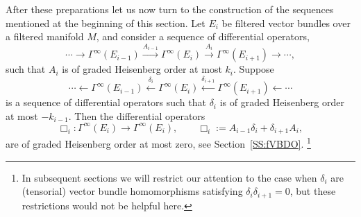 \documentclass[reqno,12pt]{amsart}
\theoremstyle{plain}
\theoremstyle{definition}
\begin{document}
After these preparations let us now turn to the construction of the sequences mentioned at the beginning of this section.
Let $E_i$ be filtered vector bundles over a filtered manifold $M$, and consider a sequence of differential operators,
\begin{equation}\label{E:EAE}
\cdots\to\Gamma^\infty(E_{i-1})\xrightarrow{A_{i-1}}\Gamma^\infty(E_i)\xrightarrow{A_i}\Gamma^\infty(E_{i+1})\to\cdots,
\end{equation}
such that $A_i$ is of graded Heisenberg order at most $k_i$.
Suppose
\begin{equation}\label{E:EdelE}
\cdots\leftarrow\Gamma^\infty(E_{i-1})\xleftarrow{\delta_i}\Gamma^\infty(E_i)\xleftarrow{\delta_{i+1}}\Gamma^\infty(E_{i+1})\leftarrow\cdots
\end{equation}
is a sequence of differential operators such that $\delta_i$ is of graded Heisenberg order at most $-k_{i-1}$.
Then the differential operators
\begin{equation}\label{E:EboxE}
\Box_i\colon\Gamma^\infty(E_i)\to\Gamma^\infty(E_i),\qquad
\Box_i:=A_{i-1}\delta_i+\delta_{i+1}A_i,
\end{equation}
are of graded Heisenberg order at most zero, see Section~\ref{SS:fVBDO}.
\footnote{In subsequent sections we will restrict our attention to the case when $\delta_i$ are (tensorial) vector bundle homomorphisms satisfying $\delta_i\delta_{i+1}=0$, but these restrictions would not be helpful here.}
\end{document}
